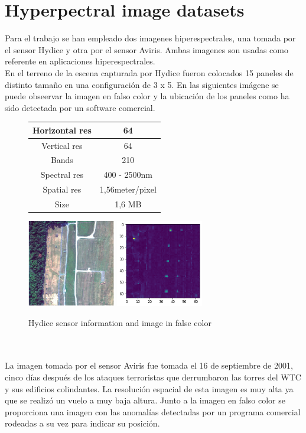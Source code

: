 \section{Hyperpectral image datasets}
Para el trabajo se han empleado dos imagenes hiperespectrales, una tomada por el sensor Hydice y otra por el sensor Aviris. Ambas imagenes son usadas como referente en aplicaciones hiperespectrales. 
\\
En el terreno de la escena capturada por Hydice fueron colocados 15 paneles de distinto tamaño en una configuración de 3 x 5. En las siguientes imágene se puede obseervar la imagen en falso color y la ubicación de los paneles como ha sido detectada por un software comercial.
\begin{figure}[!ht]
    \begin{tabular}[b]{c|c}\hline
      Horizontal res & 64 \\ \hline
      Vertical res & 64 \\ \hline
      Bands & 210 \\ \hline
      Spectral res & 400 - 2500nm \\ \hline
      Spatial res & 1,56meter/pixel \\ \hline
      Size & 1,6 MB\\ \hline
    \end{tabular}
\includegraphics[height=1.5in]{figures/hydice_bad.png}
\includegraphics[height=1.5in]{figures/hydice_rx.png}
    \caption{Hydice sensor information and image in false color}
  \end{figure}
\\
\\
La imagen tomada por el sensor Aviris fue tomada el 16 de septiembre de 2001, cinco días después de los ataques terroristas que derrumbaron las torres del WTC y sus edificios colindantes. La resolución espacial de esta imagen es muy alta ya que se realizó un vuelo a muy baja altura. Junto a la imagen en falso color se proporciona una imagen con las anomalías detectadas por un programa comercial rodeadas a su vez para indicar su posición.
